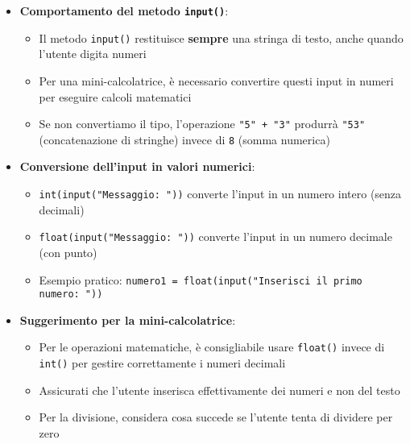 \begin{tcolorbox}[colback=gray!5!white,colframe=red!75!black,title=Input e Tipi di Dati: Informazioni Importanti]
\begin{itemize}[leftmargin=*,itemsep=0.8em]
    \item \textbf{Comportamento del metodo \texttt{input()}}:
    \begin{itemize}[itemsep=0.2em]
        \item Il metodo \texttt{input()} restituisce \textbf{sempre} una stringa di testo, anche quando l'utente digita numeri
        \item Per una mini-calcolatrice, è necessario convertire questi input in numeri per eseguire calcoli matematici
        \item Se non convertiamo il tipo, l'operazione \texttt{"5" + "3"} produrrà \texttt{"53"} (concatenazione di stringhe) invece di \texttt{8} (somma numerica)
    \end{itemize}
    
    \item \textbf{Conversione dell'input in valori numerici}:
    \begin{itemize}[itemsep=0.2em]
        \item \texttt{int(input("Messaggio: "))} converte l'input in un numero intero (senza decimali)
        \item \texttt{float(input("Messaggio: "))} converte l'input in un numero decimale (con punto)
        \item Esempio pratico: \texttt{numero1 = float(input("Inserisci il primo numero: "))}
    \end{itemize}
    
    \item \textbf{Suggerimento per la mini-calcolatrice}:
    \begin{itemize}[itemsep=0.2em]
        \item Per le operazioni matematiche, è consigliabile usare \texttt{float()} invece di \texttt{int()} per gestire correttamente i numeri decimali
        \item Assicurati che l'utente inserisca effettivamente dei numeri e non del testo
        \item Per la divisione, considera cosa succede se l'utente tenta di dividere per zero
    \end{itemize}
\end{itemize}
\end{tcolorbox}


